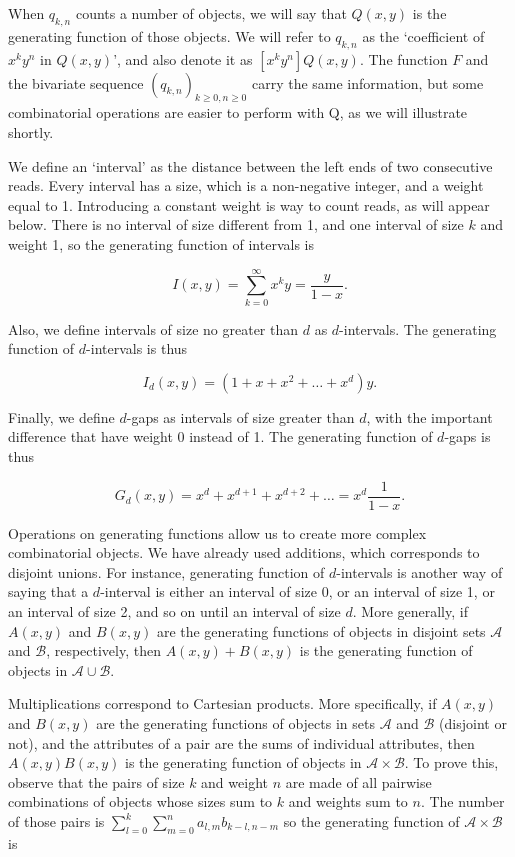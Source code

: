 \documentclass{article}
\begin{document}
When $q_{k,n}$ counts a number of objects, we will say that $Q(x,y)$ is
the generating function of those objects. We will refer to $q_{k,n}$ as
the `coefficient of $x^ky^n$ in $Q(x,y)$', and also denote it as $[x^ky^n]
Q(x,y)$. The function $F$ and the bivariate sequence $(q_{k,n})_{k \geq 0,
n \geq 0}$ carry the same information, but some combinatorial operations
are easier to perform with Q, as we will illustrate shortly.

We define an `interval' as the distance between the left ends of two
consecutive reads. Every interval has a size, which is a non-negative
integer, and a weight equal to 1. Introducing a constant weight is way to
count reads, as will appear below. There is no interval of size different
from 1, and one interval of size $k$ and weight 1, so the generating
function of intervals is

\begin{equation*}
I(x,y) = \sum_{k=0}^\infty x^ky = \frac{y}{1-x}.
\end{equation*}

Also, we define intervals of size no greater than $d$ as $d$-intervals.
The generating function of $d$-intervals is thus

\begin{equation*}
I_d(x,y) = (1+x+x^2+\ldots+x^d)y.
\end{equation*}

Finally, we define $d$-gaps as intervals of size greater than $d$, with
the important difference that have weight 0 instead of 1. The generating
function of $d$-gaps is thus

\begin{equation*}
G_d(x,y) = x^d+x^{d+1}+x^{d+2}+\ldots = x^d \frac{1}{1-x}.
\end{equation*}

Operations on generating functions allow us to create more complex
combinatorial objects. We have already used additions, which corresponds
to disjoint unions. For instance, generating function of $d$-intervals is
another way of saying that a $d$-interval is either an interval of size 0,
or an interval of size 1, or an interval of size 2, and so on until an
interval of size $d$. More generally, if $A(x,y)$ and $B(x,y)$ are the
generating functions of objects in disjoint sets $\mathcal{A}$ and
$\mathcal{B}$, respectively, then $A(x,y)+B(x,y)$ is the generating
function of objects in $\mathcal{A} \cup \mathcal{B}$.

Multiplications correspond to Cartesian products. More specifically, if
$A(x,y)$ and $B(x,y)$ are the generating functions of objects in sets
$\mathcal{A}$ and $\mathcal{B}$ (disjoint or not), and the attributes of a
pair are the sums of individual attributes, then $A(x,y)B(x,y)$ is the
generating function of objects in $\mathcal{A} \times \mathcal{B}$. To
prove this, observe that the pairs of size $k$ and weight $n$ are made of
all pairwise combinations of objects whose sizes sum to $k$ and weights
sum to $n$. The number of those pairs is $\sum_{l=0}^k \sum_{m=0}^n
a_{l,m}b_{k-l,n-m}$ so the generating function of $\mathcal{A} \times
\mathcal{B}$ is
\end{document}
